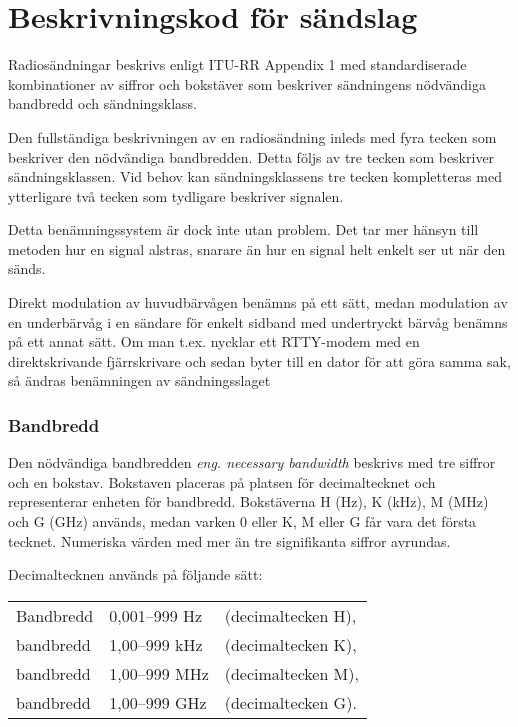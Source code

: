 \chapter{Beskrivningskod för sändslag}


Radiosändningar beskrivs enligt ITU-RR Appendix 1 med standardiserade
kombinationer av siffror och bokstäver som beskriver sändningens nödvändiga
bandbredd och sändningsklass.

Den fullständiga beskrivningen av en radiosändning inleds med fyra tecken
som beskriver den nödvändiga bandbredden. Detta följs av tre tecken som
beskriver sändningsklassen. Vid behov kan sändningsklassens tre tecken
kompletteras med ytterligare två tecken som tydligare beskriver signalen.

Detta benämningssystem är dock inte utan problem. Det tar mer hänsyn till
metoden hur en signal alstras, snarare än hur en signal helt enkelt ser ut när
den sänds.

Direkt modulation av huvudbärvågen benämns på ett sätt, medan modulation
av en underbärvåg i en sändare för enkelt sidband med undertryckt bärvåg
benämns på ett annat sätt. Om man t.ex. nycklar ett RTTY-modem med en
direktskrivande fjärrskrivare och sedan byter till en dator för att göra samma
sak, så ändras benämningen av sändningsslaget

\subsection{Bandbredd}

Den nödvändiga bandbredden \emph{eng. necessary bandwidth} beskrivs med
tre siffror och en bokstav. Bokstaven placeras på platsen för decimaltecknet
och representerar enheten för bandbredd. Bokstäverna H (Hz), K (kHz), M (MHz)
och G (GHz) används, medan varken 0 eller K, M eller G får vara det första
tecknet. Numeriska värden med mer än tre signifikanta siffror avrundas.

Decimaltecknen används på följande sätt:\\
\begin{tabular}{lll}
	Bandbredd & 0,001--999 Hz & (decimaltecken H),\\
	bandbredd & 1,00--999 kHz & (decimaltecken K),\\
	bandbredd & 1,00--999 MHz & (decimaltecken M),\\
	bandbredd & 1,00--999 GHz & (decimaltecken G).\\
\end{tabular}

